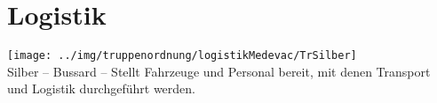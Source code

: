 \section{Logistik}
\texttt{[image: ../img/truppenordnung/logistikMedevac/TrSilber]}\\
Silber -- Bussard -- Stellt Fahrzeuge und Personal bereit, mit denen Transport und Logistik durchgeführt werden.